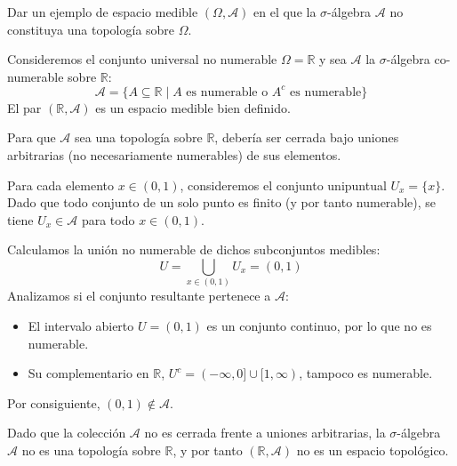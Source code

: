 \newpage
\begin{problema}
Dar un ejemplo de espacio medible $(\Omega, \mathcal{A})$ en el que la $\sigma$-álgebra $\mathcal{A}$ no constituya una topología sobre $\Omega$.

\tcblower

Consideremos el conjunto universal no numerable $\Omega = \mathbb{R}$ y sea $\mathcal{A}$ la $\sigma$-álgebra co-numerable sobre $\mathbb{R}$:
\[
    \mathcal{A} = \{ A \subseteq \mathbb{R} \mid A \text{ es numerable o } A^c \text{ es numerable} \}
\]
El par $(\mathbb{R}, \mathcal{A})$ es un espacio medible bien definido.

Para que $\mathcal{A}$ sea una topología sobre $\mathbb{R}$, debería ser cerrada bajo uniones arbitrarias (no necesariamente numerables) de sus elementos.

Para cada elemento $x \in (0,1)$, consideremos el conjunto unipuntual $U_x = \{x\}$. Dado que todo conjunto de un solo punto es finito (y por tanto numerable), se tiene $U_x \in \mathcal{A}$ para todo $x \in (0,1)$.

Calculamos la unión no numerable de dichos subconjuntos medibles:
\[
    U = \bigcup_{x \in (0,1)} U_x = (0,1)
\]
Analizamos si el conjunto resultante pertenece a $\mathcal{A}$:
\begin{itemize}
    \item El intervalo abierto $U = (0,1)$ es un conjunto continuo, por lo que no es numerable.
    \item Su complementario en $\mathbb{R}$, $U^c = (-\infty, 0] \cup [1, \infty)$, tampoco es numerable.
\end{itemize}
Por consiguiente, $(0,1) \notin \mathcal{A}$.

Dado que la colección $\mathcal{A}$ no es cerrada frente a uniones arbitrarias, la $\sigma$-álgebra $\mathcal{A}$ no es una topología sobre $\mathbb{R}$, y por tanto $(\mathbb{R}, \mathcal{A})$ no es un espacio topológico.
\end{problema}

